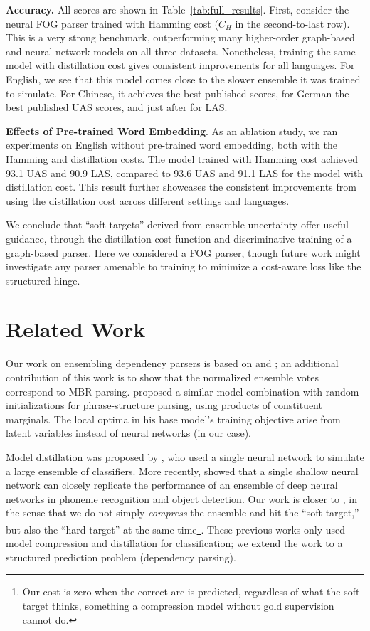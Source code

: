 \documentclass[11pt,letterpaper]{article}
\newcommand{\ignore}[1]{}
\newcommand{\lingpengcomment}[1]{\ignore{\textcolor{green}{{\textbf{[#1 --\textsc{lpk}]}}}}}
\newcommand{\miguelcomment}[1]{\ignore{\textcolor{red}{{\textbf{[#1 --\textsc{miguel}]}}}}}
\begin{document}
\textbf{Accuracy.}  All scores are shown in Table~\ref{tab:full_results}.
First, consider the neural FOG parser trained with Hamming cost ($C_{H}$ in the second-to-last row).  This is a very strong benchmark, \ignore{\miguelcomment{Difficult to call it "baseline" if it is the best result reported...}}outperforming many higher-order graph-based and neural network models on all three datasets.  Nonetheless, training the same model with distillation cost gives consistent improvements for all languages.
For English, we see that this model comes close to the slower ensemble it was trained to simulate.  For Chinese, it achieves the best published scores, for German the best published UAS scores, and just after  for LAS.

\textbf{Effects of Pre-trained Word Embedding}. As an ablation study, we ran experiments on English without pre-trained word embedding, both with the Hamming and distillation costs. The model trained with Hamming cost achieved 93.1 UAS and 90.9 LAS, compared to 93.6 UAS and 91.1 LAS for the model with distillation cost. This result further showcases the consistent improvements from using the distillation cost across different settings and languages.

We conclude that ``soft targets'' derived from ensemble uncertainty offer useful guidance, through the distillation cost function and discriminative training
of a graph-based parser.  Here we considered a FOG parser, though future work might investigate any parser amenable to training to minimize a cost-aware  loss like the structured hinge.

\section{Related Work}
Our work on ensembling dependency parsers is based on  and ; an additional contribution of this work is to show that the normalized\ignore{\lingpengcomment{normalized before and normalised here...}} ensemble votes correspond to MBR parsing.  proposed a similar model combination with random initializations for phrase-structure parsing, using products of constituent marginals. The local optima in his base model's training objective arise from latent variables instead of neural networks (in our case).

Model distillation was proposed by , who used a single neural network to simulate a large ensemble of classifiers.  More recently,  showed that a single {shallow} neural network can closely replicate the performance of an ensemble of {deep} neural networks in phoneme recognition and object detection. Our work is closer to , in the sense that we do not simply \emph{compress} the  ensemble and hit the ``soft target,'' but also the ``hard target'' at the same time\footnote{Our cost is zero when the correct arc is predicted, regardless of what the soft target thinks, something a compression model without gold supervision cannot do.}. These previous works only used model compression and distillation for classification; we extend the work to a structured prediction problem (dependency parsing).
\end{document}
